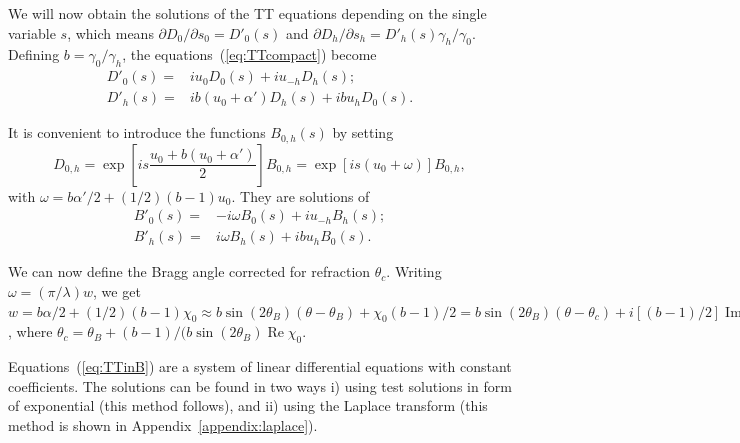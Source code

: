 \documentclass[preprint]{iucr}              %
\newcommand{\todo}[1]{{\color{red}[TODO: "#1'']}}
\newcommand{\inblue}[1]{{\color{blue}#1}}
\newcommand{\inred}[1]{{\color{red}#1}}
\begin{document}
We will now obtain the solutions of the TT equations depending on the single variable $s$, which means 
$\partial D_{0} / \partial  s_{0}=D'_{0}(s)$ and $\partial D_{h} / \partial s_{h}=D'_{h}(s)\gamma_h/\gamma_0$.
Defining $\boxed{b=\gamma_0/\gamma_h}$, the equations~(\ref{eq:TTcompact}) become
\begin{subequations}
\label{eq:TTlaue}
\begin{align}
D'_0(s) =& i u_0 D_0(s) + i u_{-h} D_h(s); \\
D'_h(s) =& i b (u_0 + \alpha') D_h(s) + i b u_{h} D_0(s).
\end{align}
\end{subequations}

It is convenient to introduce the functions $B_{0,h}(s)$ by setting
\begin{equation}
\label{eq:Bdefinition}
D_{0,h} = \exp \left[ i s \frac{u_0 + b (u_0+\alpha')}{2} \right] B_{0,h} = \exp[i s (u_0+\omega)] B_{0,h},  
\end{equation}
with
$\boxed{\omega=b \alpha'/2+ (1/2) (b-1) u_0}$. They are solutions of 
\begin{subequations}
\label{eq:TTinB}
\begin{align}
B'_0(s) =& -i \omega B_0(s) + i u_{-h} B_h(s); \\
B'_h(s) =& i \omega B_h(s) + i b u_{h} B_0(s).
\end{align}
\end{subequations}



We can now define the Bragg angle corrected for refraction $\theta_c$. Writing $\boxed{\omega=(\pi/\lambda) w}$, we get
$ w = b \alpha / 2 + (1/2) (b-1) \chi_0 \approx
b \sin(2\theta_B)(\theta-\theta_B)+\chi_0 (b-1)/2=
b \sin(2\theta_B)(\theta-\theta_c)+ i [(b-1)/2] \operatorname{Im} \chi_0$, where $\theta_c=\theta_B+ (b-1)/(b \sin(2\theta_B) \operatorname{Re}\chi_0$.

Equations~(\ref{eq:TTinB}) are a system of linear differential equations with constant coefficients. The solutions can be found in two ways i) using test solutions in form of exponential (this method follows), and ii) using the Laplace transform (this method is shown in Appendix~\ref{appendix:laplace}).
\end{document}
